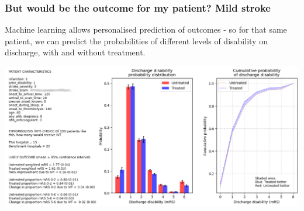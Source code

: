 \begin{frame}
\frametitle{But would be the outcome for my patient? Mild stroke}

Machine learning allows personalised prediction of outcomes - so for that same patient, we can predict the probabilities of different levels of disability on discharge, with and without treatment.

\vspace{5mm}

\begin{center}
\includegraphics[width=1.0\textwidth]{./images_outcome/full_outcome_2}
\end{center}


\end{frame}
